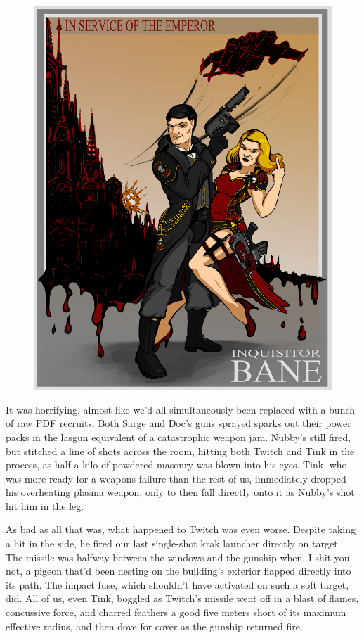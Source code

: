 \begin{figure}
	\begin{center}
		\includegraphics[width=\figwidth]{pics/18/69 large.png}
	\end{center}
\end{figure}
It was horrifying, almost like we'd all simultaneously been replaced with a bunch of raw PDF recruits. 
Both Sarge and Doc's guns sprayed sparks out their power packs in the lasgun equivalent of a catastrophic weapon jam. 
Nubby's still fired, but stitched a line of shots across the room, hitting both Twitch and Tink in the process, as half a kilo of powdered masonry was blown into his eyes. 
Tink, who was more ready for a weapons failure than the rest of us, immediately dropped his overheating plasma weapon, only to then fall directly onto it as Nubby's shot hit him in the leg. 


As bad as all that was, what happened to Twitch was even worse. 
Despite taking a hit in the side, he fired our last single-shot krak launcher directly on target. 
The missile was halfway between the windows and the gunship when, I shit you not, a pigeon that'd been nesting on the building's exterior flapped directly into its path. 
The impact fuse, which shouldn't have activated on such a soft target, did. 
All of us, even Tink, boggled as Twitch's missile went off in a blast of flames, concussive force, and charred feathers a good five meters short of its maximum effective radius, and then dove for cover as the gunship returned fire.

